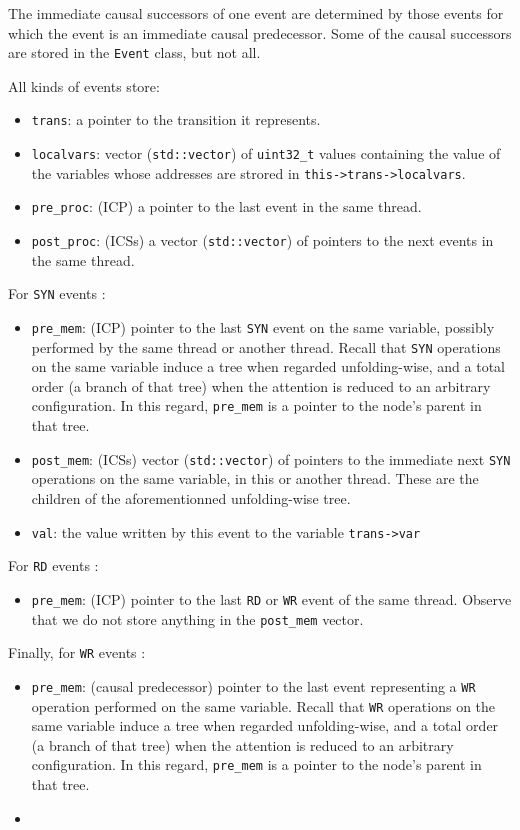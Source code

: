 \documentclass{llncs}
\begin{document}
\begin{enumerate}
The immediate causal successors of one event are determined by those events
for which the event is an immediate causal predecessor. Some of the causal
successors are stored in the \verb!Event! class, but not all.

All kinds of events store:
\begin{itemize}
\item
  \verb!trans!: a pointer to the transition it represents.
\item
  \verb!localvars!: vector (\verb!std::vector!) of \verb!uint32_t! values
  containing the value of the variables whose addresses are strored in
  \verb!this->trans->localvars!.
\item
  \verb!pre_proc!: (ICP) a pointer to the last event in the same thread.
\item
  \verb!post_proc!: (ICSs) a vector (\verb!std::vector!) of pointers to
  the next events in the same thread.
\end{itemize}
%
For \verb!SYN! events :
\begin{itemize}
\item
  \verb!pre_mem!: (ICP) pointer to the last \verb!SYN! event on the same
  variable, possibly performed by the same thread or another thread.
  Recall that \verb!SYN! operations on the same variable induce a tree when
  regarded unfolding-wise, and a total order (a branch of that tree) when
  the attention is reduced to an arbitrary configuration.
  In this regard, \verb!pre_mem! is a pointer to the node's parent in that
  tree.
\item
  \verb!post_mem!: (ICSs) vector (\verb!std::vector!) of pointers to
  the immediate next \verb!SYN! operations on the same variable, in this or
  another thread. These are the children of the aforementionned
  unfolding-wise tree.
\item
  \verb!val!: the value written by this event to the variable \verb!trans->var!
\end{itemize}
%
For \verb!RD! events :
\begin{itemize}
\item
  \verb!pre_mem!: (ICP) pointer to the last \verb!RD! or \verb!WR! event of
  the same thread. Observe that we do not store anything in the
  \verb!post_mem! vector.
\end{itemize}
%
Finally, for \verb!WR! events :
\begin{itemize}
\item
  \verb!pre_mem!: (causal predecessor) pointer to the last event
  representing a \verb!WR! operation performed on the same variable.
  Recall that \verb!WR! operations on the same variable induce a tree when
  regarded unfolding-wise, and a total order (a branch of that tree) when
  the attention is reduced to an arbitrary configuration.
  In this regard, \verb!pre_mem! is a pointer to the node's parent in that
  tree.
\item
	

\end{itemize}
\end{enumerate}
\end{document}
